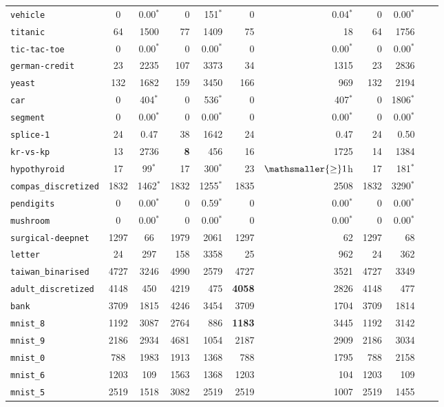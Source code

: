 \begin{tabular}{lccrrrrrrrr}
\texttt{vehicle} & 0 & 0.00$^*$ & 0 & 151$^*$ & 0 & 0.04$^*$ & 0 & 0.00$^*$\\
\texttt{titanic} & 64 & 1500 & 77 & 1409 & 75 & 18 & 64 & 1756\\
\texttt{tic-tac-toe} & 0 & 0.00$^*$ & 0 & 0.00$^*$ & 0 & 0.00$^*$ & 0 & 0.00$^*$\\
\texttt{german-credit} & 23 & 2235 & 107 & 3373 & 34 & 1315 & 23 & 2836\\
\texttt{yeast} & 132 & 1682 & 159 & 3450 & 166 & 969 & 132 & 2194\\
\texttt{car} & 0 & 404$^*$ & 0 & 536$^*$ & 0 & 407$^*$ & 0 & 1806$^*$\\
\texttt{segment} & 0 & 0.00$^*$ & 0 & 0.00$^*$ & 0 & 0.00$^*$ & 0 & 0.00$^*$\\
\texttt{splice-1} & 24 & 0.47 & 38 & 1642 & 24 & 0.47 & 24 & 0.50\\
\texttt{kr-vs-kp} & 13 & 2736 & \textbf{8} & 456 & 16 & 1725 & 14 & 1384\\
\texttt{hypothyroid} & 17 & 99$^*$ & 17 & 300$^*$ & 23 & $\mathsmaller{\geq}1$h & 17 & 181$^*$\\
\texttt{compas\_discretized} & 1832 & 1462$^*$ & 1832 & 1255$^*$ & 1835 & 2508 & 1832 & 3290$^*$\\
\texttt{pendigits} & 0 & 0.00$^*$ & 0 & 0.59$^*$ & 0 & 0.00$^*$ & 0 & 0.00$^*$\\
\texttt{mushroom} & 0 & 0.00$^*$ & 0 & 0.00$^*$ & 0 & 0.00$^*$ & 0 & 0.00$^*$\\
\texttt{surgical-deepnet} & 1297 & 66 & 1979 & 2061 & 1297 & 62 & 1297 & 68\\
\texttt{letter} & 24 & 297 & 158 & 3358 & 25 & 962 & 24 & 362\\
\texttt{taiwan\_binarised} & 4727 & 3246 & 4990 & 2579 & 4727 & 3521 & 4727 & 3349\\
\texttt{adult\_discretized} & 4148 & 450 & 4219 & 475 & \textbf{4058} & 2826 & 4148 & 477\\
\texttt{bank} & 3709 & 1815 & 4246 & 3454 & 3709 & 1704 & 3709 & 1814\\
\texttt{mnist\_8} & 1192 & 3087 & 2764 & 886 & \textbf{1183} & 3445 & 1192 & 3142\\
\texttt{mnist\_9} & 2186 & 2934 & 4681 & 1054 & 2187 & 2909 & 2186 & 3034\\
\texttt{mnist\_0} & 788 & 1983 & 1913 & 1368 & 788 & 1795 & 788 & 2158\\
\texttt{mnist\_6} & 1203 & 109 & 1563 & 1368 & 1203 & 104 & 1203 & 109\\
\texttt{mnist\_5} & 2519 & 1518 & 3082 & 2519 & 2519 & 1007 & 2519 & 1455\\

\end{tabular}
